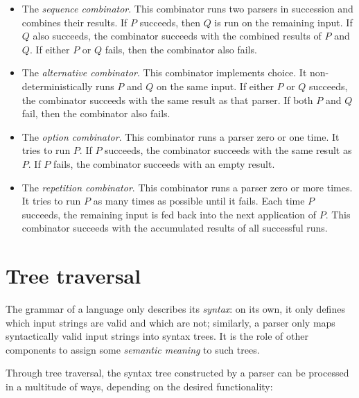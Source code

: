 \documentclass[UdineBachThesis,american,11pt]{PhdThesis}
\begin{document}
  \begin{itemize}
    \item The \emph{sequence combinator}. This combinator runs two parsers in
    succession and combines their results. If $P$ succeeds, then $Q$ is run on
    the remaining input. If $Q$ also succeeds, the combinator succeeds with the
    combined results of $P$ and $Q$\@. If either $P$ or $Q$ fails, then the
    combinator also fails.

    \item The \emph{alternative combinator}. This combinator implements choice.
    It non-deterministically runs $P$ and $Q$ on the same input. If either $P$
    or $Q$ succeeds, the combinator succeeds with the same result as that
    parser. If both $P$ and $Q$ fail, then the combinator also fails.

    \item The \emph{option combinator}. This combinator runs a parser zero or
    one time. It tries to run $P$\@. If $P$ succeeds, the combinator succeeds
    with the same result as $P$\@. If $P$ fails, the combinator succeeds with an
    empty result.

    \item The \emph{repetition combinator}. This combinator runs a parser zero
    or more times. It tries to run $P$ as many times as possible until it fails.
    Each time $P$ succeeds, the remaining input is fed back into the next
    application of $P$\@. This combinator succeeds with the accumulated results
    of all successful runs.
  \end{itemize}

  \newpage

  \section{Tree traversal}

  The grammar of a language only describes its \emph{syntax}: on its own, it
  only defines which input strings are valid and which are not; similarly, a
  parser only maps syntactically valid input strings into syntax trees. It is
  the role of other components to assign some \emph{semantic meaning} to such
  trees.

  Through tree traversal, the syntax tree constructed by a parser can be
  processed in a multitude of ways, depending on the desired functionality:
\end{document}

